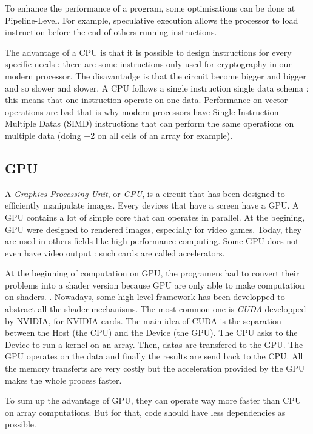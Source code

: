 
To enhance the performance of a program, some optimisations can be done at Pipeline-Level. For example, speculative execution allows the processor to load instruction before the end of others running instructions. 

The advantage of a CPU is that it is possible to design instructions for every specific needs : there are some instructions only used for cryptography in our modern processor. The disavantadge is that the circuit become bigger and bigger and so slower and slower. A CPU follows a single instruction single data  schema : this means that one instruction operate on one data. Performance on vector operations are bad that is why modern processors have Single Instruction Multiple Datas (SIMD) instructions that can perform the same operations on multiple data (doing +2 on all cells of an array for example).

\subsection{GPU}
A \emph{Graphics Processing Unit}, or \emph{GPU}, is a circuit that has been designed to efficiently manipulate images. Every devices that have a screen have a GPU. A GPU contains a lot of simple core that can operates in parallel. At the begining, GPU were designed to rendered images, especially for video games. Today, they are used in others fields like high performance computing. Some GPU does not even have video output : such cards are called accelerators.

At the beginning of computation on GPU, the programers had to convert their problems into a shader version because GPU are only able to make computation on shaders. . Nowadays, some high level framework has been developped to abstract all the shader mechanisms. The most common one is \emph{CUDA}  developped by NVIDIA, for NVIDIA cards. The main idea of CUDA is the separation between the Host (the CPU) and the Device (the GPU). The CPU asks to the Device to run a kernel on an array. Then, datas are transfered to the GPU. The GPU operates on the data and finally the results are send back to the CPU. All the memory transferts are very costly but the acceleration provided by the GPU makes the whole process faster. 

To sum up the advantage of GPU, they can operate way more faster than CPU on array computations. But for that, code should have less dependencies as possible.

